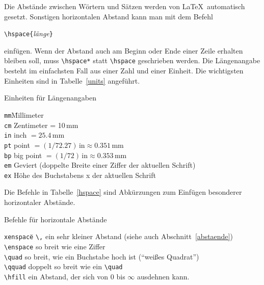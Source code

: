 Die Abstände zwischen Wörtern und Sätzen werden von \LaTeX\ 
automatisch gesetzt.
Sonstigen horizontalen Abstand kann man mit dem Befehl
\begin{beispiel}
\verb|\hspace{|\textit{länge}\verb|}|
\end{beispiel}
einfügen.
Wenn der Abstand auch am Beginn oder Ende einer Zeile
erhalten bleiben soll, muss \verb|\hspace*| statt \verb|\hspace|
geschrieben werden.
Die Längenangabe besteht im einfachsten Fall aus einer Zahl
und einer Einheit.  Die wichtigsten Einheiten sind in
Tabelle~\ref{units} angeführt.
\begin{table}[b]
\caption{Einheiten für Längenangaben} \label{units}
\begin{lminipage}{11cm}
\begin{tabbing}
\texttt{mm}\qquad \= Millimeter                               \\
\texttt{cm} \> Zentimeter = 10\,mm                            \\
\texttt{in} \> inch \(= 25.4\,\mathrm{mm} \)                  \\
\texttt{pt} \> point \( =(1/72.27)\,\mathrm{in}
                        \approx 0.351\,\mathrm{mm}\)          \\
\texttt{bp} \> big point \( =(1/72)\,\mathrm{in}
                            \approx 0.353\,\mathrm{mm} \)      \\
\texttt{em} \> Geviert (doppelte Breite einer Ziffer der aktuellen Schrift)\\
\texttt{ex} \> Höhe des Buchstabens x der aktuellen Schrift
\end{tabbing}                    
\end{lminipage}
\end{table}
Die Befehle in Tabelle~\ref{hspace} sind Abkürzungen zum Einfügen
besonderer horizontaler Abstände.
\begin{table}[t]
\caption{Befehle für horizontale Abstände} \label{hspace}
\begin{lminipage}{13cm}
\begin{tabbing}
\texttt{xenspace}\qquad \= \kill
\verb|\,|       \> ein sehr kleiner Abstand (siehe auch Abschnitt~\ref{abstaende})\\
\verb|\enspace| \> so breit wie eine Ziffer \\
\verb|\quad|    \> so breit, wie ein Buchstabe hoch ist
                   ("`weißes Quadrat"') \\
\verb|\qquad|   \> doppelt so breit wie ein \verb|\quad| \\
\verb|\hfill|   \> ein Abstand, der sich von 0 bis \(\infty\)
                   ausdehnen kann.
\end{tabbing}
\end{lminipage}
\end{table}
